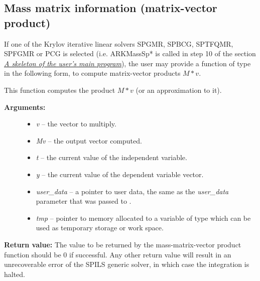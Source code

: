 \documentclass[letterpaper,10pt,english]{sphinxmanual}
\begin{document}
\subsection{Mass matrix information (matrix-vector product)}
\label{c_interface/User_supplied:mass-matrix-information-matrix-vector-product}\label{c_interface/User_supplied:cinterface-mtimesfn}
If one of the Krylov iterative linear solvers SPGMR, SPBCG, SPTFQMR,
SPFGMR or PCG is selected (i.e. ARKMassSp* is called in step 10 of the
section {\hyperref[c_interface/Skeleton:cinterface-skeleton]{\emph{A skeleton of the user's main program}}}), the user may provide a function
of type {\hyperref[c_interface/User_supplied:ARKSpilsMassTimesVecFn]{}} in the following form, to
compute matrix-vector products $M*v$.

\begin{fulllineitems}
\label{c_interface/User_supplied:ARKSpilsMassTimesVecFn}
This function computes the product $M*v$ (or an approximation to it).
\begin{description}
\item[{\textbf{Arguments:}}] \leavevmode\begin{itemize}
\item {} 
\emph{v} -- the vector to multiply.

\item {} 
\emph{Mv} -- the output vector computed.

\item {} 
\emph{t} -- the current value of the independent variable.

\item {} 
\emph{y} -- the current value of the dependent variable vector.

\item {} 
\emph{user\_data} -- a pointer to user data, the same as the
\emph{user\_data} parameter that was passed to {\hyperref[c_interface/User_callable:ARKodeSetUserData]{}}.

\item {} 
\emph{tmp} -- pointer to memory allocated to a variable of type
 which can be used as temporary storage or work space.

\end{itemize}

\end{description}

\textbf{Return value:}
The value to be returned by the mass-matrix-vector product
function should be 0 if successful. Any other return value will
result in an unrecoverable error of the SPILS generic solver,
in which case the integration is halted.

\end{fulllineitems}
\end{document}
